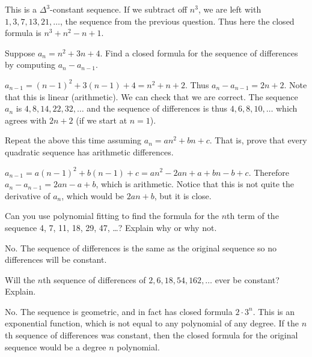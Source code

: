 \begin{questions}
	\begin{answer}
	 This is a $\Delta^3$-constant sequence.  If we subtract off $n^3$, we are left with $1, 3, 7, 13, 21, \ldots$, the sequence from the previous question.  Thus here the closed formula is $n^3 + n^2 - n + 1$.
	\end{answer}

	

\question Suppose $a_n = n^2 + 3n + 4$.  Find a closed formula for the sequence of differences by computing $a_n - a_{n-1}$.

	\begin{answer}
		$a_{n-1} = (n-1)^2 + 3(n-1) + 4 = n^2 + n + 2$.  Thus $a_n - a_{n-1} = 2n+2$.  Note that this is linear (arithmetic).  We can check that we are correct.  The sequence $a_n$ is $4, 8, 14, 22, 32, \ldots$ and the sequence of differences is thus $4, 6, 8, 10,\ldots$ which agrees with $2n+2$ (if we start at $n = 1$).
	\end{answer}	
	

\question Repeat the above this time assuming $a_n = an^2 + bn + c$.  That is, prove that every quadratic sequence has arithmetic differences.

	\begin{answer}
		$a_{n-1} = a(n-1)^2 + b(n-1) + c = an^2 - 2an + a + bn - b + c$.  Therefore $a_n - a_{n-1} = 2an - a + b$, which is arithmetic.  Notice that this is not quite the derivative of $a_n$, which would be $2an + b$, but it is close.
	\end{answer}


\question Can you use polynomial fitting to find the formula for the $n$th term of the sequence 4, 7, 11, 18, 29, 47, \ldots?  Explain why or why not. 

	\begin{answer}
		No.  The sequence of differences is the same as the original sequence so no differences will be constant. 
	\end{answer}
	
	
\question Will the $n$th sequence of differences of $2, 6, 18, 54, 162, \ldots$ ever be constant?  Explain.

	\begin{answer}
		No.  The sequence is geometric, and in fact has closed formula $2\cdot 3^n$.  This is an exponential function, which is not equal to any polynomial of any degree.  If the $n$th sequence of differences was constant, then the closed formula for the original sequence would be a degree $n$ polynomial.
	\end{answer}
	




\end{questions}